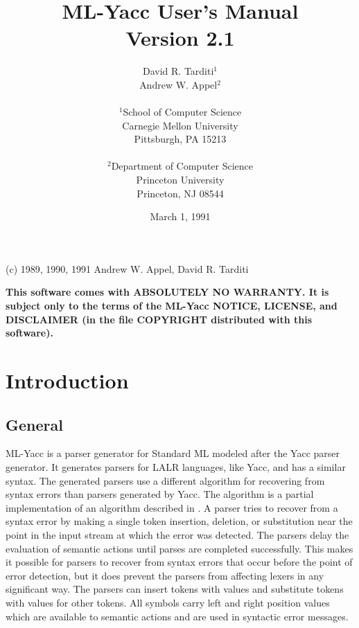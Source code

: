 \title{                        ML-Yacc User's Manual \\
			       Version 2.1
      }
\author{                David R. Tarditi$^1$\\
                        Andrew W. Appel$^2$\\
\\              
$^1$School of Computer Science \\
Carnegie Mellon University \\
Pittsburgh, PA 15213 \\
\\
$^2$Department of Computer Science \\
    Princeton University \\
    Princeton, NJ 08544 
}
\date{March 1, 1991}


\maketitle
\begin{center}
(c) 1989, 1990, 1991 Andrew W. Appel, David R. Tarditi
\end{center}

{\bf
This software comes with ABSOLUTELY NO WARRANTY.  It is subject only to
the terms of the ML-Yacc NOTICE, LICENSE, and DISCLAIMER (in the
file COPYRIGHT distributed with this software).
}

\newpage
\tableofcontents
\newpage

\section{Introduction}
\subsection{General}
ML-Yacc is a parser generator for Standard ML modeled after the
Yacc parser generator.  It generates parsers for LALR languages, like Yacc,
and has a similar syntax.  The generated parsers use a different algorithm 
for recovering from syntax errors than parsers generated by Yacc.  
The algorithm is a partial implementation of an algorithm described in \cite{bf}.
A parser tries to recover from a syntax error
by making a single token insertion, deletion, or
substitution near the point in the input stream at which the error
was detected.  The parsers delay the evaluation of semantic actions until
parses are completed successfully.  This makes it possible for
parsers to recover from syntax errors that occur before the point
of error detection, but it does prevent the parsers from
affecting lexers in any significant way.  The parsers
can insert tokens with values and substitute tokens with values
for other tokens. All symbols carry left and right position values
which are available to semantic actions and are used in
syntactic error messages.

